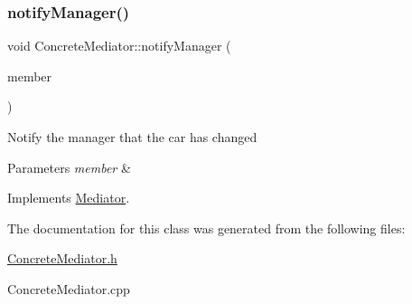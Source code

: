 \subsubsection{\texorpdfstring{notify\+Manager()}{notifyManager()}}
{\footnotesize\ttfamily void Concrete\+Mediator\+::notify\+Manager (\begin{DoxyParamCaption}\item[{\mbox{\hyperlink{class_pit_crew}{Pit\+Crew}} $\ast$}]{member }\end{DoxyParamCaption})\hspace{0.3cm}{\ttfamily [virtual]}}

Notify the manager that the car has changed 
\begin{DoxyParams}{Parameters}
{\em member} & \\
\hline
\end{DoxyParams}


Implements \mbox{\hyperlink{class_mediator_a044f7032c52ca2359f98b798ccd555d3}{Mediator}}.



The documentation for this class was generated from the following files\+:\begin{DoxyCompactItemize}
\item 
\mbox{\hyperlink{_concrete_mediator_8h}{Concrete\+Mediator.\+h}}\item 
Concrete\+Mediator.\+cpp\end{DoxyCompactItemize}
